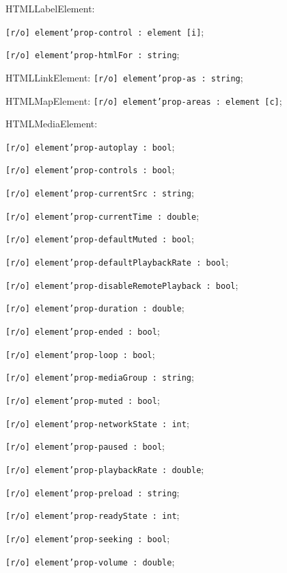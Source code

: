 \begin{icItems}
	\item HTMLLabelElement:
	\begin{icItems}
		\item \texttt{[r/o] element'prop-control : element [i]};
		\item \texttt{[r/o] element'prop-htmlFor : string};
	\end{icItems}
	
	\item HTMLLinkElement: \texttt{[r/o] element'prop-as : string};
	\item HTMLMapElement: \texttt{[r/o] element'prop-areas : element [c]};
	
	\item HTMLMediaElement:
	\begin{icItems}
		\item \texttt{[r/o] element'prop-autoplay : bool};
		\item \texttt{[r/o] element'prop-controls : bool};
		\item \texttt{[r/o] element'prop-currentSrc : string};
		\item \texttt{[r/o] element'prop-currentTime : double};
		\item \texttt{[r/o] element'prop-defaultMuted : bool};
		\item \texttt{[r/o] element'prop-defaultPlaybackRate : bool};
		\item \texttt{[r/o] element'prop-disableRemotePlayback : bool};
		\item \texttt{[r/o] element'prop-duration : double};
		\item \texttt{[r/o] element'prop-ended : bool};
		\item \texttt{[r/o] element'prop-loop : bool};
		\item \texttt{[r/o] element'prop-mediaGroup : string};
		\item \texttt{[r/o] element'prop-muted : bool};
		\item \texttt{[r/o] element'prop-networkState : int};
		\item \texttt{[r/o] element'prop-paused : bool};
		\item \texttt{[r/o] element'prop-playbackRate : double};
		\item \texttt{[r/o] element'prop-preload : string};
		\item \texttt{[r/o] element'prop-readyState : int};
		\item \texttt{[r/o] element'prop-seeking : bool};
		\item \texttt{[r/o] element'prop-volume : double};
	\end{icItems}
	

\end{icItems}

